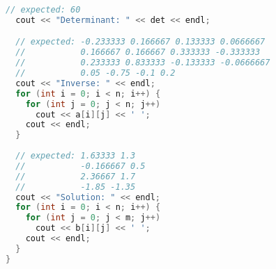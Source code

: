 \begin{lstlisting}[language=C++]
  // expected: 60  
  cout << "Determinant: " << det << endl;

  // expected: -0.233333 0.166667 0.133333 0.0666667
  //           0.166667 0.166667 0.333333 -0.333333
  //           0.233333 0.833333 -0.133333 -0.0666667
  //           0.05 -0.75 -0.1 0.2
  cout << "Inverse: " << endl;
  for (int i = 0; i < n; i++) {
    for (int j = 0; j < n; j++)
      cout << a[i][j] << ' ';
    cout << endl;
  }
  
  // expected: 1.63333 1.3
  //           -0.166667 0.5
  //           2.36667 1.7
  //           -1.85 -1.35
  cout << "Solution: " << endl;
  for (int i = 0; i < n; i++) {
    for (int j = 0; j < m; j++)
      cout << b[i][j] << ' ';
    cout << endl;
  }
}
\end{lstlisting}